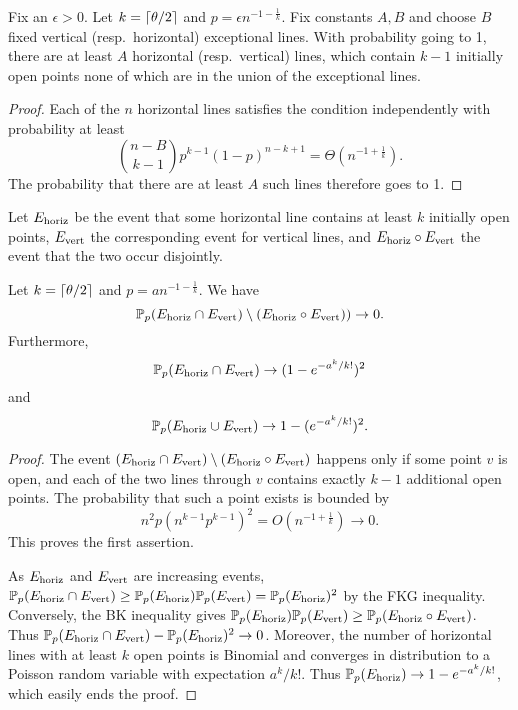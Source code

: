 \begin{lemma} \label{underlines} Fix an $\epsilon>0$. 
Let $k = \lceil \theta/2\rceil$ and $p = \epsilon n^{-1-\frac{1}{k}}$. Fix constants $A,B$
and choose $B$ fixed vertical (resp.~horizontal) exceptional lines.  
With probability going to 1, there are at least $A$ horizontal (resp.~vertical) 
lines, which contain $k-1$ initially open points none of 
which are in the union of the exceptional lines. 
\end{lemma}
\begin{proof}
Each of the $n$ horizontal lines satisfies the condition independently with probability at least
$${{n-B} \choose {k-1}}p^{k-1}(1-p)^{n-k+1} = \Theta(n^{-1+\frac{1}{k}}).$$
The probability that there are at least $A$ such lines 
therefore goes to 1.
\end{proof}

Let $E_{\text{horiz}}$ be the event that some horizontal line contains at least 
$k$ initially open points, $E_{\text{vert}}$ the corresponding event for vertical lines, and 
 $E_{\text{horiz}} \circ E_{\text{vert}}$ the event that the two occur disjointly. 

\begin{lemma} \label{e1e2}
Let $k = \lceil \theta/2\rceil$ and $p = a n^{-1-\frac{1}{k}}$.  We have $$\mathbb{P}_p(E_{\text{horiz}} \cap E_{\text{vert}}) \setminus (E_{\text{horiz}} \circ E_{\text{vert}})) \to 0.$$ Furthermore, 
$$\mathbb{P}_p(E_{\text{horiz}} \cap E_{\text{vert}}) \to (1-e^{-a^k/k!})^2$$ and 
$$\mathbb{P}_p(E_{\text{horiz}} \cup E_{\text{vert}}) \to 1-(e^{-a^k/k!})^2.$$
\end{lemma}
\begin{proof}
The event $(E_{\text{horiz}} \cap E_{\text{vert}}) \setminus (E_{\text{horiz}} \circ E_{\text{vert}})$ happens only if some point $v$ is open, and each of the two lines through $v$ contains exactly $k-1$ additional open points. 
The probability that such a point exists is bounded by 
$$n^2p\left({n^ {k-1}}p^{k-1}\right)^2 = O(n^{-1+\frac{1}{k}}) \to 0.$$ This 
proves the first assertion.

As $E_{\text{horiz}}$ and $E_{\text{vert}}$ are increasing events, $\mathbb{P}_p(E_{\text{horiz}} \cap E_{\text{vert}})\ge \mathbb{P}_p(E_{\text{horiz}})\mathbb{P}_p(E_{\text{vert}})=\mathbb{P}_p(E_{\text{horiz}})^2$
by the FKG inequality. 
Conversely, the BK inequality gives
$\mathbb{P}_p(E_{\text{horiz}})\mathbb{P}_p(E_{\text{vert}}) \ge \mathbb{P}_p(E_{\text{horiz}} \circ E_{\text{vert}})$.  
Thus $\mathbb{P}_p(E_{\text{horiz}} \cap E_{\text{vert}})- \mathbb{P}_p(E_{\text{horiz}})^2\to 0$. Moreover,
the number of horizontal lines with at least $k$ open points is Binomial and converges 
in distribution to  
a Poisson random variable with expectation $a^k/k!$. Thus $\mathbb{P}_p(E_{\text{horiz}})\to 1-e^{-a^k/k!}$, 
which easily ends the proof.
\end{proof}

